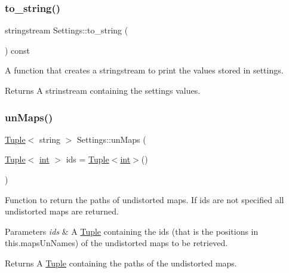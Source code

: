 \subsubsection{\texorpdfstring{to\_string()}{to\_string()}}
{\footnotesize\ttfamily stringstream Settings\+::to\+\_\+string (\begin{DoxyParamCaption}{ }\end{DoxyParamCaption}) const\hspace{0.3cm}{\ttfamily [inline]}}



A function that creates a stringstream to print the values stored in settings. 

\begin{DoxyReturn}{Returns}
A strinstream containing the settings values. 
\end{DoxyReturn}
\mbox{\label{class_settings_a7cbf0234eaca6582ce982f0cf756d282}} 
\subsubsection{\texorpdfstring{unMaps()}{unMaps()}\hspace{0.1cm}{\footnotesize\ttfamily [1/4]}}
{\footnotesize\ttfamily \mbox{\hyperlink{class_tuple}{Tuple}}$<$ string $>$ Settings\+::un\+Maps (\begin{DoxyParamCaption}\item[{\mbox{\hyperlink{class_tuple}{Tuple}}$<$ \mbox{\hyperlink{draw_8hh_aa620a13339ac3a1177c86edc549fda9b}{int}} $>$}]{ids = {\ttfamily \mbox{\hyperlink{class_tuple}{Tuple}}$<$\mbox{\hyperlink{draw_8hh_aa620a13339ac3a1177c86edc549fda9b}{int}}$>$()} }\end{DoxyParamCaption})}



Function to return the paths of undistorted maps. If ids are not specified all undistorted maps are returned. 


\begin{DoxyParams}{Parameters}
{\em ids} & A \mbox{\hyperlink{class_tuple}{Tuple}} containing the ids (that is the positions in this.\+maps\+Un\+Names) of the undistorted maps to be retrieved. \\
\hline
\end{DoxyParams}
\begin{DoxyReturn}{Returns}
A \mbox{\hyperlink{class_tuple}{Tuple}} containing the paths of the undistorted maps. 
\end{DoxyReturn}
\mbox{\label{class_settings_a0619c378aff05b5762afe0280b40e07a}} 
